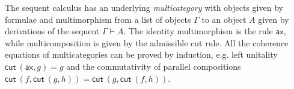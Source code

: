 \documentclass[a4paper,UKenglish,cleveref,autoref,thm-restate, anonymous]{lipics-v2021}
\newcommand{\proofbox}[1]{\begin{array}{c} #1 \end{array}}
\newcommand{\mf}[1]{\mathsf{#1}}
\newcommand{\GG}{\Gamma}
\newcommand{\GD}{\Delta}
\newcommand{\GL}{\Lambda}
\newcommand{\GO}{\Omega}
\renewcommand{\L}{$\mathtt{L}$}
\newcommand{\LPfree}{$\mathtt{L_{pf}}$}
\newcommand{\vd}{\vdash}
\newcommand{\ax}{\mathsf{ax}}
\newcommand{\cut}{\mf{cut}}
\begin{document}
The sequent calculus has an underlying \emph{multicategory} \cite{Lambek1969} with objects given by formulae and multimorphism from a list of objects $\Gamma$ to an object $A$ given by derivations of the sequent $\Gamma \vdash A$. The identity multimorphism is the rule $\ax$, while multicomposition is given by the admissible cut rule. All the coherence equations of multicategories can be proved by induction, e.g. left unitality $\cut \ (\ax , g) = g$ and the commutativity of parallel compositions $\cut \ (f, \cut \ (g, h)) = \cut \ (g , \cut \ (f , h))$.
\end{document}
